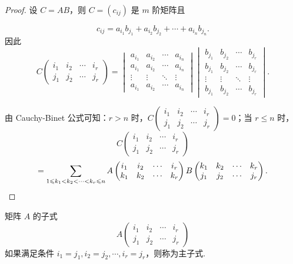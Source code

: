 \begin{proof}
    设 $C = AB$，则 $C = (c_{ij})$ 是 $m$ 阶矩阵且

    \[ c_{ij} = a_{i_1} b_{j_1} + a_{i_2} b_{j_2} + \cdots + a_{i_n} b_{j_n}. \]
    因此
    \[
    C
    \begin{pmatrix}
        i_1 & i_2 & \cdots & i_r \\
        j_1 & j_2 & \cdots & j_r
    \end{pmatrix}
    =
    \begin{vmatrix}
        a_{i_1} & a_{i_2} & \cdots & a_{i_n} \\
        a_{i_1} & a_{i_2} & \cdots & a_{i_n} \\
        \vdots & \vdots & \ddots & \vdots \\
        a_{i_1} & a_{i_2} & \cdots & a_{i_n}
    \end{vmatrix}
    \begin{vmatrix}
        b_{j_1} & b_{j_2} & \cdots & b_{j_r} \\
        b_{j_1} & b_{j_2} & \cdots & b_{j_r} \\
        \vdots & \vdots & \ddots & \vdots \\
        b_{j_1} & b_{j_2} & \cdots & b_{j_r}
    \end{vmatrix}.
    \]

    由 Cauchy-Binet 公式可知：$r > n$ 时，$C
    \begin{pmatrix}
        i_1 & i_2 & \cdots & i_r \\
        j_1 & j_2 & \cdots & j_r
    \end{pmatrix} = 0$；当 $r \leqslant n$ 时，
    \[
    C
    \begin{pmatrix}
        i_1 & i_2 & \cdots & i_r \\
        j_1 & j_2 & \cdots & j_r
    \end{pmatrix} \]
    \[ =\sum_{1 \leqslant k_1 < k_2 < \cdots < k_r \leqslant n} A
    \begin{pmatrix}
        i_1 & i_2 & \cdots & i_r \\
        k_1 & k_2 & \cdots & k_r
    \end{pmatrix}
    B
    \begin{pmatrix}
        k_1 & k_2 & \cdots & k_r \\
        j_1 & j_2 & \cdots & j_r
    \end{pmatrix}. \qedhere \]
\end{proof}

矩阵 $A$ 的子式
\[ A
\begin{pmatrix}
    i_1 & i_2 & \cdots & i_r \\
    j_1 & j_2 & \cdots & j_r
\end{pmatrix} \]
如果满足条件 $i_1 = j_1, i_2 = j_2, \cdots, i_r = j_r$，则称为主子式.

